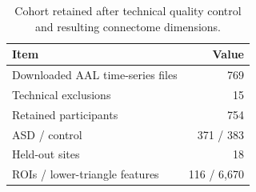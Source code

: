 \begin{table}[!t]
\centering
\caption{Cohort retained after technical quality control and resulting connectome dimensions.}
\label{tab:cohort}
\footnotesize
\begin{tabular}{lr}
\toprule
Item & Value \\
\midrule
Downloaded AAL time-series files & 769 \\
Technical exclusions & 15 \\
Retained participants & 754 \\
ASD / control & 371 / 383 \\
Held-out sites & 18 \\
ROIs / lower-triangle features & 116 / 6,670 \\
\bottomrule
\end{tabular}
\end{table}
